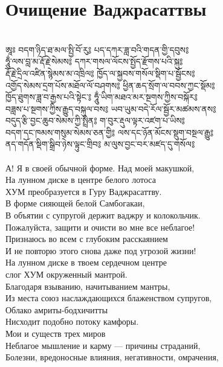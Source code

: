 \section{Очищение Ваджрасаттвы}
\\
\ti
ཨཱཿ བདག་ཉིད་ཐ་མལ་སྤྱི་བོ་རུ༔ པད་དཀར་ཟླ་བའི་གདན་གྱི་དབུས༔ \\
ཧཱུྂ་ལས་བླ་མ་རྡོ་རྗེ་སེམས༔ དཀར་གསལ་ལོངས་སྤྱོད་རྫོགས་པའི་སྐུ༔\\
རྡོ་རྗེ་དྲིལ་འཛིན་སྙེམས་མ་འཁྲིལ༔ ཁྱོད་ལ་སྐྱབས་གསོལ་སྡིག་པ་སྦྱོངས༔ \\
འགྱོད་སེམས་དྲག་པོས་མཐོལ་ལོ་བཤགས༔ ཕྱིན་ཆད་སྲོག་ལ་བབས་ཀྱང་སྡོམ༔ \\
ཁྱོད་ཐུགས་ཟླ་བ་རྒྱས་པའི་སྟེང་༔ ཧཱུྂ་ཡིག་མཐའ་མར་སྔགས་ཀྱིས་བསྐོར༔ \\
བཟླས་པ་སྔགས་ཀྱིས་རྒྱུད་བསྐུལ་བས༔ ཡབ་ཡུམ་བདེ་རོལ་སྦྱོར་མཚམས་ནས༔ \\
བདུད་རྩི་བྱང་ཆུབ་སེམས་ཀྱི་སྤྲིན༔ ག་བུར་རྡུལ་ལྟར་འཛག་པ་ཡིས༔ \\
བདག་དང་ཁམས་གསུམ་སེམས་ཅན་གྱི༔ ལས་དང་ཉོན་མོངས་སྡུག་བསྔལ་རྒྱུ༔ \\
ནད་གདོན་སྡིག་སྒྲིབ་ཉེས་ལྟུང་གྲིབ༔ མ་ལུས་བྱང་བར་མཛད་དུ་གསོལ༔\\
\\
\ru
А! Я в своей обычной форме. Над моей макушкой,\\
На лунном диске в центре белого лотоса\\
ХУМ преобразуется в Гуру Ваджрасаттву.\\
В форме сияющей белой Самбогакаи,\\
В объятии с супругой держит ваджру и колокольчик.\\
Пожалуйста, защити и очисти во мне все неблагое!\\
Признаюсь во всем с глубоким расскаянием\\
И не повторю этого снова даже под угрозой жизни!\\
На лунном диске в твоем сердечном центре\\
слог ХУМ окруженный мантрой.\\
Благодаря взыванию, начитыванием мантры,\\
Из места союз наслаждающихся блаженством супругов,\\
Облако амриты-бодхичитты\\
Нисходит подобно потоку камфоры.\\
Мои и существ трех миров\\
Неблагое мышление и карму — причины страданий,\\
Болезни, вредоносные влияния, негативности, омрачения,\\
